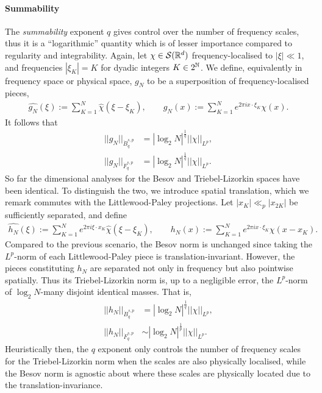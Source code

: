 	\paragraph*{\textbf{Summability}} 
	The \textit{summability} exponent $q$ gives control over the number of frequency scales, thus it is a ``logarithmic'' quantity which is of lesser importance compared to regularity and integrability. Again, let $\chi \in \mathcal S (\mathbb R^d)$ frequency-localised to $|\xi| \ll 1$, and frequencies $|\xi_K| = K$ for dyadic integers $K \in 2^\mathbb N$. We define, equivalently in frequency space or physical space, $g_N$ to be a superposition of frequency-localised pieces, 
		\begin{align*}
			 \widehat{g_N} (\xi) 
			 	:= \sum_{K = 1}^N \widehat\chi(\xi - \xi_K),\qquad
			 g_N (x)
			 	:= \sum_{K = 1}^N e^{2\pi i x \cdot \xi_K} \chi(x). 
		\end{align*}	 	
	It follows that 
		\begin{align*}
			||g_N||_{\dot B^{s, p}_q} 
				&= |\log_2 N|^{\frac1q} ||\chi||_{L^p}, \\
			||g_N||_{\dot F^{s, p}_q}
				&= |\log_2 N|^{\frac1q} ||\chi||_{L^p}.
		\end{align*}
	So far the dimensional analyses for the Besov and Triebel-Lizorkin spaces have been identical. To distinguish the two, we introduce spatial translation, which we remark commutes with the Littlewood-Paley projections. Let $|x_K| \ll_p |x_{2K}|$ be sufficiently separated, and define 
			\begin{align*}
			 \widehat{h_N} (\xi) 
			 	:= \sum_{K = 1}^N  e^{2\pi i \xi \cdot x_K}\widehat\chi(\xi - \xi_K),\qquad h_N (x)
			 	:= \sum_{K = 1}^N e^{2\pi i x \cdot \xi_K} \chi(x - x_K). 
		\end{align*}	
	Compared to the previous scenario, the Besov norm is unchanged since taking the $L^p$-norm of each Littlewood-Paley piece is translation-invariant. However,  the pieces constituting $h_N$ are separated not only in frequency but also pointwise spatially. Thus its Triebel-Lizorkin norm is, up to a negligible error, the $L^p$-norm of $\log_2 N$-many disjoint identical masses. That is,  	
		\begin{align*}
			||h_N||_{\dot B^{s, p}_q} 
				&= |\log_2 N|^{\frac1q} ||\chi||_{L^p}, \\
			||h_N||_{\dot F^{s, p}_q}
				&\sim |\log_2 N|^{\frac1p} ||\chi||_{L^p}.
		\end{align*}
	Heuristically then, the $q$ exponent only controls the number of frequency scales for the Triebel-Lizorkin norm when the scales are also physically localised, while the Besov norm is agnostic about where these scales are physically located due to the translation-invariance. 

